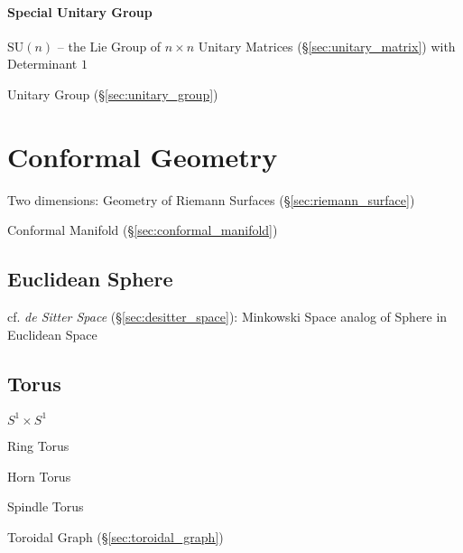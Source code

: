\paragraph{Special Unitary Group}\label{sec:special_unitary}\hfill

$\mathrm{SU}(n)$ -- the Lie Group of $n \times n$ Unitary Matrices
(\S\ref{sec:unitary_matrix}) with Determinant $1$

Unitary Group (\S\ref{sec:unitary_group})



\section{Conformal Geometry}\label{sec:conformal_geometry}

Two dimensions: Geometry of Riemann Surfaces
(\S\ref{sec:riemann_surface})

\fist Conformal Manifold (\S\ref{sec:conformal_manifold})



\subsection{Euclidean Sphere}\label{sec:euclidean_sphere}

cf. \emph{de Sitter Space} (\S\ref{sec:desitter_space}): Minkowski Space analog
of Sphere in Euclidean Space



\subsection{Torus}\label{sec:torus}

$S^1 \times S^1$

Ring Torus

Horn Torus

Spindle Torus

\fist Toroidal Graph (\S\ref{sec:toroidal_graph})




